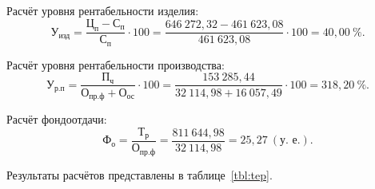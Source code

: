 Расчёт уровня рентабельности изделия:
\begin{equation*}
  \text{У}_{\text{изд}} =
  \dfrac{\text{Ц}_{\text{п}} - \text{С}_{\text{п}}}{\text{С}_{\text{п}}} \cdot 100 =
  \dfrac{646~272{,}32 - 461~623{,}08}{461~623{,}08} \cdot 100 = 40{,}00 ~ \%.
\end{equation*}

Расчёт уровня рентабельности производства:
\begin{equation*}
  \text{У}_{\text{р.п}} =
  \dfrac{\text{П}_{\text{ч}}}{\text{О}_{\text{пр.ф}} + \text{О}_{\text{ос}}} \cdot 100 =
  \dfrac{153~285{,}44}{32~114{,}98 + 16~057{,}49} \cdot 100 = 318{,}20~\%.
\end{equation*}

Расчёт фондоотдачи:
\begin{equation*}
  \text{Ф}_{\text{о}} =
  \dfrac{\text{Т}_{\text{р}}}{\text{О}_{\text{пр.ф}}} =
  \dfrac{811~644{,}98}{32~114{,}98} = 25{,}27~(\text{у.~е.}).
\end{equation*}

Результаты расчётов представлены в таблице~\ref{tbl:tep}.


